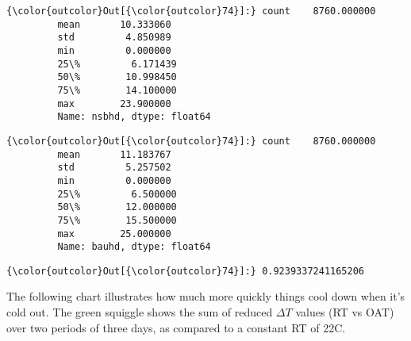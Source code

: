 \documentclass[11pt]{article}
\begin{document}
\begin{Verbatim}[commandchars=\\\{\}]
{\color{outcolor}Out[{\color{outcolor}74}]:} count    8760.000000
         mean       10.333060
         std         4.850989
         min         0.000000
         25\%         6.171439
         50\%        10.998450
         75\%        14.100000
         max        23.900000
         Name: nsbhd, dtype: float64
\end{Verbatim}
            
\begin{Verbatim}[commandchars=\\\{\}]
{\color{outcolor}Out[{\color{outcolor}74}]:} count    8760.000000
         mean       11.183767
         std         5.257502
         min         0.000000
         25\%         6.500000
         50\%        12.000000
         75\%        15.500000
         max        25.000000
         Name: bauhd, dtype: float64
\end{Verbatim}
            
\begin{Verbatim}[commandchars=\\\{\}]
{\color{outcolor}Out[{\color{outcolor}74}]:} 0.9239337241165206
\end{Verbatim}
            
    The following chart illustrates how much more quickly things cool down
when it's cold out. The green squiggle shows the sum of reduced
\(\Delta T\) values (RT vs OAT) over two periods of three days, as
compared to a constant RT of 22C.
\end{document}
